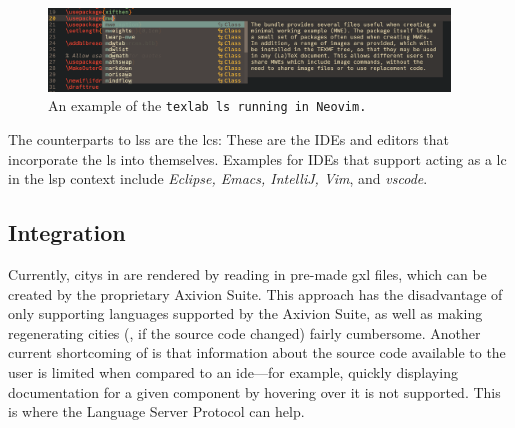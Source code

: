 \documentclass[../thesis]{subfiles}
\begin{document}
\begin{figure}
	\begin{center}
		\includegraphics[width=0.95\textwidth]{../figures/mwe}
	\end{center}
	\caption[An example of the \texttt{texlab} language server running in Neovim.]{An example of the \tt{texlab} \gls{ls} running in Neovim.}\label{fig:mwe}
\end{figure}

The counterparts to \glspl{ls} are the \glspl{lc}:
These are the IDEs and editors that incorporate the \gls{ls} into themselves.
Examples for IDEs that support acting as a \gls{lc} in the \gls{lsp} context include \emph{Eclipse, Emacs, IntelliJ, Vim}, and \emph{\gls{vscode}}.

\subsection{Integration}\label{subsec:integration}
Currently, \glspl{city} in \SEE{} are rendered by reading in pre-made \gls{gxl} files, which can be created by the proprietary Axivion Suite.
This approach has the disadvantage of only supporting languages supported by the Axivion Suite, as well as making regenerating cities (\eg, if the source code changed) fairly cumbersome.
Another current shortcoming of \SEE{} is that information about the source code available to the user is limited when compared to an \gls{ide}---for example, quickly displaying documentation for a given component by hovering over it is not supported.
This is where the Language Server Protocol can help.


%
\end{document}
